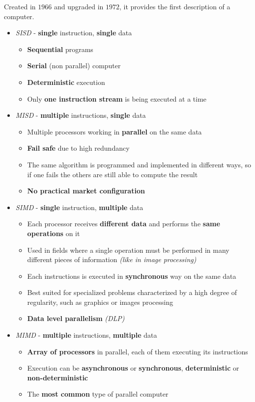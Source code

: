 \documentclass[english]{article}
\begin{document}
Created in \(1966\) and upgraded in \(1972\), it provides the first description of a computer.

\begin{itemize}
  \item \textit{SISD} - \textbf{single} instruction, \textbf{single} data
        \begin{itemize}
          \item \textbf{Sequential} programs
          \item \textbf{Serial} (non parallel) computer
          \item \textbf{Deterministic} execution
          \item Only \textbf{one instruction stream} is being executed at a time
        \end{itemize}
  \item \textit{MISD} - \textbf{multiple} instructions, \textbf{single} data
        \begin{itemize}
          \item Multiple processors working in \textbf{parallel} on the same data
          \item \textbf{Fail safe} due to high redundancy
          \item The same algorithm is programmed and implemented in different ways, so if one fails the others are still able to compute the result
          \item \textbf{No practical market configuration}
        \end{itemize}
  \item \textit{SIMD} - \textbf{single} instruction, \textbf{multiple} data
        \begin{itemize}
          \item Each processor receives \textbf{different data} and performs the \textbf{same operations} on it
          \item Used in fields where a single operation must be performed in many different pieces of information \textit{(like in image processing)}
          \item Each instructions is executed in \textbf{synchronous} way on the same data
          \item Best suited for specialized problems characterized by a high degree of regularity, such as graphics or images processing
          \item \textbf{Data level parallelism} \textit{(DLP)}
        \end{itemize}
  \item \textit{MIMD} - \textbf{multiple} instructions, \textbf{multiple} data
        \begin{itemize}
          \item \textbf{Array of processors} in parallel, each of them executing its instructions
          \item Execution can be \textbf{asynchronous} or \textbf{synchronous}, \textbf{deterministic} or \textbf{non-deterministic}
          \item The \textbf{most common} type of parallel computer
        \end{itemize}
\end{itemize}
\end{document}
